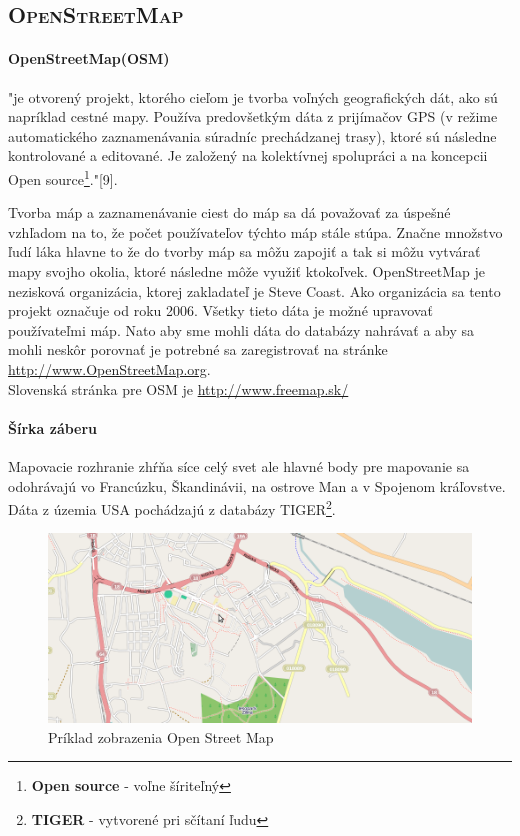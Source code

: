 \subsection{\textsc{OpenStreetMap}}
\paragraph{OpenStreetMap(OSM)}
  "je otvorený projekt, ktorého cieľom je tvorba voľných
geografických dát, ako sú napríklad cestné mapy. Používa predovšetkým dáta z
prijímačov GPS (v režime automatického zaznamenávania súradníc prechádzanej
trasy), ktoré sú následne kontrolované a editované. Je založený na kolektívnej
spolupráci a na koncepcii Open source\footnote{\textbf{Open source} - voľne šíriteľný}."[9].

Tvorba máp a zaznamenávanie ciest do máp sa dá považovať za úspešné vzhľadom na to, že počet používateľov týchto máp stále stúpa. Značne množstvo ľudí láka hlavne to že do tvorby máp sa môžu zapojiť a tak si môžu vytvárať mapy svojho okolia, ktoré následne môže využiť ktokoľvek. OpenStreetMap je nezisková organizácia, ktorej zakladateľ je Steve Coast. Ako organizácia sa tento projekt označuje od roku 2006. Všetky tieto dáta je možné upravovať používateľmi máp. Nato aby sme mohli dáta do databázy nahrávať a aby sa mohli neskôr porovnať je potrebné sa zaregistrovať na stránke \url{http://www.OpenStreetMap.org}. \\
Slovenská stránka pre OSM je \url{http://www.freemap.sk/}


\paragraph{Šírka záberu} Mapovacie rozhranie zhŕňa síce celý svet ale hlavné body pre mapovanie sa odohrávajú vo Francúzku, Škandinávii, na ostrove Man a v Spojenom kráľovstve. Dáta z územia USA pochádzajú z databázy TIGER\footnote{\textbf{TIGER} - vytvorené pri sčítaní ľudu}. 

\begin{figure}[ht]
\centering
\includegraphics[width=14.5cm]{obr/osm}
\caption{Príklad zobrazenia Open Street Map}
\end{figure}


